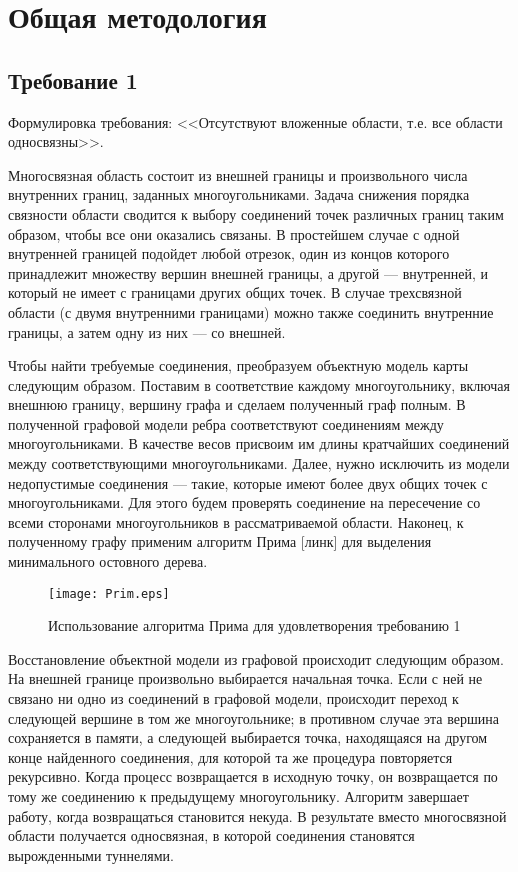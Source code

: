 \section{Общая методология}
\label{}

\subsection{Требование 1}
\label{}

Формулировка требования: <<Отсутствуют вложенные области, т.е. все области односвязны>>.

Многосвязная область состоит из внешней границы и произвольного числа внутренних границ, заданных многоугольниками. Задача снижения порядка связности области сводится к выбору соединений точек различных границ таким образом, чтобы все они оказались связаны. В простейшем случае с одной внутренней границей подойдет любой отрезок, один из концов которого принадлежит множеству вершин внешней границы, а другой --- внутренней, и который не имеет с границами других общих точек. В случае трехсвязной области (с двумя внутренними границами) можно также соединить внутренние границы, а затем одну из них --- со внешней.

Чтобы найти требуемые соединения, преобразуем объектную модель карты следующим образом. Поставим в соответствие каждому многоугольнику, включая внешнюю границу, вершину графа и сделаем полученный граф полным. В полученной графовой модели ребра соответствуют соединениям между многоугольниками. В качестве весов присвоим им длины кратчайших соединений между соответствующими многоугольниками. Далее, нужно исключить из модели недопустимые соединения --- такие, которые имеют более двух общих точек с многоугольниками. Для этого будем проверять соединение на пересечение со всеми сторонами многоугольников в рассматриваемой области. Наконец, к полученному графу применим алгоритм Прима [линк] для выделения минимального остовного дерева.

\begin{figure}[h]
    \centering
    \texttt{[image: Prim.eps]}
    \caption{Использование алгоритма Прима для удовлетворения требованию 1}
    \label{fig:prim}
\end{figure}

Восстановление объектной модели из графовой происходит следующим образом. На внешней границе произвольно выбирается начальная точка. Если с ней не связано ни одно из соединений в графовой модели, происходит переход к следующей вершине в том же многоугольнике; в противном случае эта вершина сохраняется в памяти, а следующей выбирается точка, находящаяся на другом конце найденного соединения, для которой та же процедура повторяется рекурсивно. Когда процесс возвращается в исходную точку, он возвращается по тому же соединению к предыдущему многоугольнику. Алгоритм завершает работу, когда возвращаться становится некуда. В результате вместо многосвязной области получается односвязная, в которой соединения становятся вырожденными туннелями.

